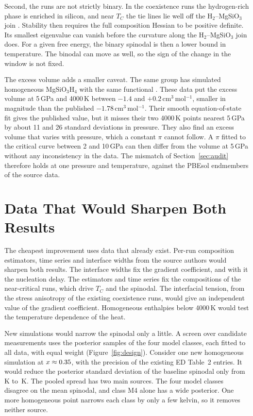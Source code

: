 Second, the runs are not strictly binary. In the coexistence runs the hydrogen-rich phase is
enriched in silicon, and near $T_C$ the tie lines lie well off the H$_2$--MgSiO$_3$ join
\cite{gilmore2026data}. Stability then requires the full composition Hessian to be
positive definite. Its smallest eigenvalue can vanish before the curvature along the
H$_2$--MgSiO$_3$ join does. For a given free energy, the binary spinodal is then a lower bound
in temperature. The binodal can move as well, so the sign of the change in the window is not fixed.

The excess volume adds a smaller caveat. The same group has simulated homogeneous
MgSiO$_3$H$_4$ with the same functional \cite{marcum2026}. These data put the excess volume at
5\,GPa and 4000\,K between $-1.4$ and $+0.2$\,cm$^3$\,mol$^{-1}$, smaller in magnitude than the
published $-1.78$\,cm$^3$\,mol$^{-1}$. Their smooth equation-of-state fit gives the published
value, but it misses their two 4000\,K points nearest 5\,GPa by about 11 and 26 standard
deviations in pressure.
They also find an excess volume that varies with pressure, which a constant $\pi$ cannot follow.
A $\pi$ fitted to the critical curve between 2 and 10\,GPa can then differ from the volume at
5\,GPa without any inconsistency in the data. The mismatch of Section~\ref{sec:audit} therefore
holds at one pressure and temperature, against the PBEsol endmembers of the source data.

\section{Data That Would Sharpen Both Results}\label{sec:design}

The cheapest improvement uses data that already exist. Per-run composition estimators, time
series and interface widths from the source authors would sharpen both results. The interface
widths fix the gradient coefficient, and with it the nucleation delay. The estimators and time
series fix the compositions of the near-critical runs, which drive $T_C$ and the spinodal. The
interfacial tension, from the stress anisotropy of the existing coexistence runs, would give an
independent value of the gradient coefficient. Homogeneous enthalpies below 4000\,K would test
the temperature dependence of the heat.

New simulations would narrow the spinodal only a little. A screen over candidate measurements
uses the posterior samples of the four model classes, each fitted to all data, with equal weight
(Figure~\ref{fig:design}). Consider one new homogeneous simulation at
$x \approx 0.35{}$, with the precision of the existing ED Table~2 entries. It would
reduce the posterior standard deviation of the baseline spinodal only from \designSdNow{}\,K to
\designSdAfter{}\,K. The pooled spread has two main sources. The four model classes disagree on
the mean spinodal, and class M4 alone has a wide posterior. One more homogeneous point narrows
each class by only a few kelvin, so it removes neither source.

